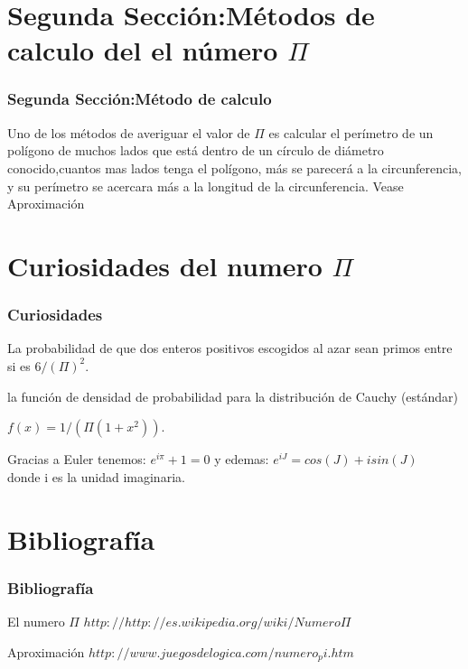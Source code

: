 \documentclass{beamer}
\begin{document}
\section{Segunda Sección:Métodos de calculo del el número $\Pi$}

\begin{frame}

\frametitle{Segunda Sección:Método de calculo}
Uno de los métodos de averiguar el valor de $\Pi$ es calcular el perímetro de un polígono de muchos lados que está dentro de un círculo de diámetro conocido,cuantos mas lados tenga el polígono, más se parecerá a la circunferencia, y su perímetro se acercara más a la longitud de la circunferencia.
Vease \alert{Aproximación}~\cite{latex} 


\end{frame}
\section{Curiosidades del numero $\Pi$}
\begin{frame}
\frametitle{Curiosidades}
La probabilidad de que dos enteros positivos escogidos al azar sean primos entre si es $6/(\Pi)^2$.
\end{frame}
\begin{frame}
la función de densidad de probabilidad para la distribución de Cauchy (estándar)

    $f(x) = 1/(\Pi (1 + x^2))$. 
\end{frame}
\begin{frame}
Gracias a Euler tenemos:
    $e^{i \pi} + 1 = 0$ 
y edemas:    
    $e^{iJ} = cos (J) + isin (J)$\\
    donde i es la unidad imaginaria.
\end{frame}

\section{Bibliografía}
\begin{frame}
  \frametitle{Bibliografía}

  \begin{thebibliography}{10}

    \beamertemplatebookbibitems
    El numero $\Pi{}$ 
    {\small $http://http://es.wikipedia.org/wiki/Numero \Pi$}

    \beamertemplatebookbibitems
   Aproximación {\small $http://www.juegosdelogica.com/numero_pi.htm$}
  \end{thebibliography}
\end{frame}

\end{document}
